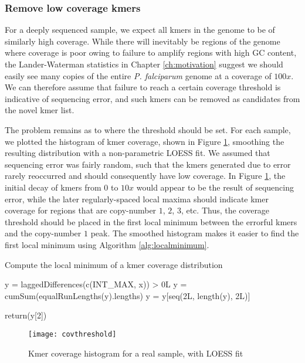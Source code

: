 \subsubsection{Remove low coverage kmers}

For a deeply sequenced sample, we expect all kmers in the genome to be of similarly high coverage.  While there will inevitably be regions of the genome where coverage is poor owing to failure to amplify regions with high GC content, the Lander-Waterman statistics in Chapter \ref{ch:motivation} suggest we should easily see many copies of the entire \textit{P. falciparum} genome at a coverage of $100x$.  We can therefore assume that failure to reach a certain coverage threshold is indicative of sequencing error, and such kmers can be removed as candidates from the novel kmer list.

The problem remains as to where the threshold should be set.  For each sample, we plotted the histogram of kmer coverage, shown in Figure \ref{fig:covthreshold}, smoothing the resulting distribution with a non-parametric LOESS fit.  We assumed that sequencing error was fairly random, such that the kmers generated due to error rarely reoccurred and should consequently have low coverage.  In Figure \ref{fig:covthreshold}, the initial decay of kmers from $0$ to $10x$ would appear to be the result of sequencing error, while the later regularly-spaced local maxima should indicate kmer coverage for regions that are copy-number $1$, $2$, $3$, etc.  Thus, the coverage threshold should be placed in the first local minimum between the errorful kmers and the copy-number $1$ peak.  The smoothed histogram makes it easier to find the first local minimum using Algorithm \ref{alg:localminimum}.

\begin{algorithm}
\caption{Compute the local minimum of a kmer coverage distribution}
\label{alg:localminimum}
\begin{algorithmic}[1]
    \State y = laggedDifferences(c(INT\_MAX, x)) > 0L
    \State y = cumSum(equalRunLengths(y).lengths)
    \State y = y[seq(2L, length(y), 2L)]

    \State return(y[2])
\EndFunction
\end{algorithmic}
\end{algorithm}

\begin{figure}[h!]
  \centering
    \texttt{[image: covthreshold]}
  \caption{Kmer coverage histogram for a real sample, with LOESS fit}
  \label{fig:covthreshold}
\end{figure}


